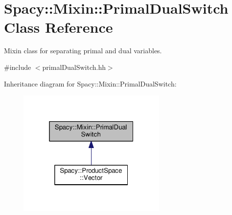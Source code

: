 \hypertarget{classSpacy_1_1Mixin_1_1PrimalDualSwitch}{}\section{Spacy\+:\+:Mixin\+:\+:Primal\+Dual\+Switch Class Reference}
\label{classSpacy_1_1Mixin_1_1PrimalDualSwitch}


Mixin class for separating primal and dual variables.  




{\ttfamily \#include $<$primal\+Dual\+Switch.\+hh$>$}



Inheritance diagram for Spacy\+:\+:Mixin\+:\+:Primal\+Dual\+Switch\+:\nopagebreak
\begin{figure}[H]
\begin{center}
\leavevmode
\includegraphics[width=208pt]{classSpacy_1_1Mixin_1_1PrimalDualSwitch__inherit__graph}
\end{center}
\end{figure}
